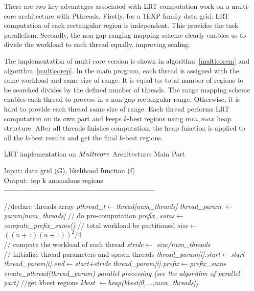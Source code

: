 \documentclass[AMA,LATO1COL]{WileyNJD-v2-bak}
\begin{document}
There are two key advantages associated with LRT computation work on a multi-core architecture with Pthreads. Firstly, for a 1EXP family data grid, LRT computation of each rectangular region is independent. This provides the task parallelism. Secondly, the non-gap ranging mapping scheme clearly enables us to divide the workload to each thread equally, improving scaling.

The implementation of multi-core version is shown in algorithm~\ref{multicorem} and algorithm~\ref{multicorep}. In the main program, each thread is assigned with the same workload and same size of range. It is equal to: total number of regions to be searched divides by the defined number of threads. The range mapping scheme enables each thread to process in a non-gap rectangular range. Otherwise, it is hard to provide each thread same size of range. Each thread performs LRT computation on its own part and keeps $k$-best regions using $min, max$ heap structure. After all threads finishes computation, the heap function is applied to all the $k$-best results and get the final $k$-best regions.

\begin{algorithm}[t!]
\caption{LRT implementation on $Multi\-core$ Architecture: Main Part}\label{multicorem}
Input: data grid (G), likelihood function (f)\\
Output: top k anomalous regions\\
------------------------------------------------------------------ \\
\begin{algorithmic}[1]

\State //declare threads array
\State \textit  {pthread\_t\(\leftarrow\)thread[num\_threads]}
\State \textit  {thread\_param \(\leftarrow\)param[num\_threads]}
\State // do pre-computation
\State \textit  {prefix\_sums\(\leftarrow\)compute\_prefix\_sums()}
\State // total workload be partitioned
\State \textit  {size\(\leftarrow\) ${((n+1)(n+1))^2/4}$\\}
\State // compute the workload of each thread
\State \textit  {stride\(\leftarrow\) {size/num\_threads}\\}
\State // initialize thread parameters and spawn threads
\State \textit {thread\_param[i].start\(\leftarrow\)start}
\State \textit {thread\_param[i].end\(\leftarrow\)start+stride}
\State \textit {thread\_param[i].prefix\(\leftarrow\)prefix\_sums}
\State \textit {create\_pthread(thread\_param)}
\EndFor
\State \textit {parallel processing (see the algorithm of parallel part)}
\State //get kbest regions
\State \textit {kbest \(\leftarrow\)heap(kbest[0,...,num\_threads])}
\end{algorithmic}
\end{algorithm}
\end{document}
